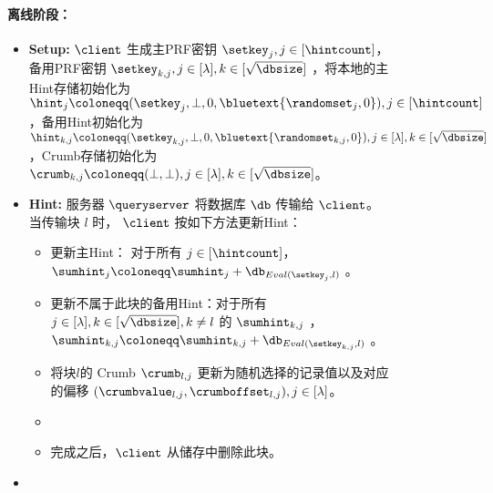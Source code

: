 \begin{figure*}
\begin{mdframed}
        \paragraph{离线阶段：}
        \begin{itemize}
            \item \textbf{Setup:} $\client$ 生成主PRF密钥 $\setkey_j, j\in[\hintcount]$，备用PRF密钥 $\setkey_{k,j}, j\in[\lambda], k\in[\sqrt{\dbsize}]$ ，将本地的主Hint存储初始化为 $\hint_j\coloneqq(\setkey_j,\bot,0,\bluetext{\randomset_j,0}), j\in[\hintcount]$，备用Hint初始化为 $\hint_{k,j}\coloneqq(\setkey_{k,j},\bot, 0,\bluetext{\randomset_{k,j},0}), j\in[\lambda], k\in[\sqrt{\dbsize}]$，Crumb存储初始化为$\crumb_{k,j} \coloneqq (\bot,\bot),j\in[\lambda], k\in[\sqrt{\dbsize}]$。
            \item \textbf{Hint:} 服务器 $\queryserver$ 将数据库 $\db$ 传输给 $\client$。 当传输块 $l$ 时， $\client$ 按如下方法更新Hint：
                  \begin{itemize}
                      \item 更新主Hint： 对于所有 $j\in[\hintcount]$，$\sumhint_j \coloneqq \sumhint_j+\db_{Eval(\setkey_j, l)}$ 。
                      \item 更新不属于此块的备用Hint：对于所有 $j\in[\lambda], k\in[\sqrt{\dbsize}], k\neq l$ 的 $\sumhint_{k,j}$ ，$\sumhint_{k,j} \coloneqq  \sumhint_{k,j}+\db_{Eval(\setkey_{k,j}, l)} $ 。
                      \item 将块$l$的 Crumb $\crumb_{l,j}$ 更新为随机选择的记录值以及对应的偏移 $(\crumbvalue_{l,j}, \crumboffset_{l,j}), j\in[\lambda] $。
                      \item {}
                      \item 完成之后，$\client$ 从储存中删除此块。
                    \end{itemize}
                \item {}
        \end{itemize}

\end{mdframed}
\end{figure*}
